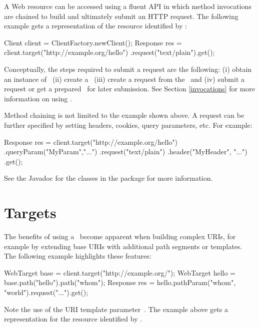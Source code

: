 A Web resource can be accessed using a fluent API in which method	 invocations are chained to build and ultimately submit an HTTP request. The following example gets a  representation of the resource identified by :

\begin{listing}{1}
Client client = ClientFactory.newClient();
Response res = client.target("http://example.org/hello")
    .request("text/plain").get();
\end{listing}

Conceptually, the steps required to submit a request are the following: (i) obtain an instance of \Client\ (ii) create a \WebTarget\ (iii) create a request from the \WebTarget\ and (iv) submit a request or get a prepared \Invocation\ for later submission. See Section \ref{invocations} for more information on using \Invocation.

Method chaining is not limited to the example shown above. A request can be further specified by setting headers, cookies, query parameters, etc. For example:

\begin{listing}{1}
Response res = client.target("http://example.org/hello")
    .queryParam("MyParam","...")
    .request("text/plain")
    .header("MyHeader", "...")
    .get();
\end{listing}

See the Javadoc for the classes in the  package for more information.

\section{Targets}

The benefits of using a \WebTarget\ become apparent when building complex URIs, for example by extending base URIs with additional path segments or templates. The following example highlights these features:

\begin{listing}{1}
WebTarget base = client.target("http://example.org/");
WebTarget hello = base.path("hello").path("{whom}");   
Response res = hello.pathParam("whom", "world").request("...").get();
\end{listing}

Note the use of the URI template parameter~. The example above gets a representation for the resource identified by .

